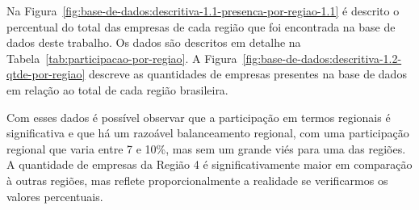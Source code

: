 Na Figura~\ref{fig:base-de-dados:descritiva-1.1-presenca-por-regiao-1.1} é descrito o percentual do total das empresas de cada região que foi encontrada na base de dados deste trabalho. Os dados são descritos em detalhe na Tabela~\ref{tab:participacao-por-regiao}. A Figura~\ref{fig:base-de-dados:descritiva-1.2-qtde-por-regiao} descreve as quantidades de empresas presentes na base de dados em relação ao total de cada região brasileira.

Com esses dados é possível observar que a participação em termos regionais é significativa e que há um razoável balanceamento regional, com uma participação regional que varia entre 7 e 10\%, mas sem um grande viés para uma das regiões. A quantidade de empresas da Região 4 é significativamente maior em comparação à outras regiões, mas reflete proporcionalmente a realidade se verificarmos os valores percentuais.

